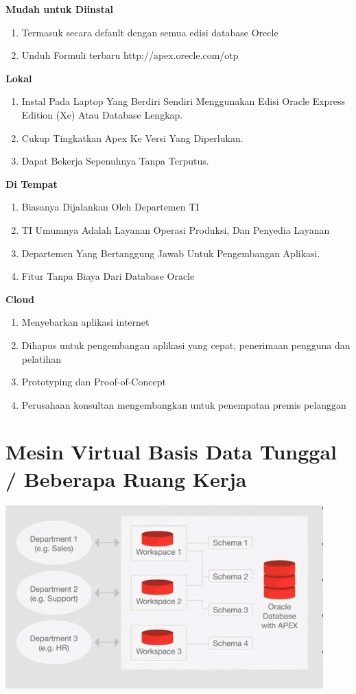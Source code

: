 \documentclass{article}
\begin{document}
\textbf{Mudah untuk Diinstal}
\begin{enumerate}
    \item Termasuk secara default dengan semua edisi database Orecle
    \item Unduh Formuli terbaru http://apex.orecle.com/otp

\end{enumerate}



\textbf{Lokal}
\begin{enumerate}
    \item Instal Pada Laptop Yang Berdiri Sendiri Menggunakan Edisi Oracle Express Edition (Xe) Atau Database Lengkap.
\item Cukup Tingkatkan Apex Ke Versi Yang Diperlukan.
\item Dapat Bekerja Sepenuhnya Tanpa Terputus.
\end{enumerate} 


\textbf{Di Tempat}
\begin{enumerate}
    \item Biasanya Dijalankan Oleh Departemen TI
\item TI Umumnya Adalah Layanan Operasi Produksi, Dan Penyedia Layanan
\item Departemen Yang Bertanggung Jawab Untuk Pengembangan Aplikasi.
\item Fitur Tanpa Biaya Dari Database Oracle
\end{enumerate}


\textbf{Cloud}
\begin{enumerate}
    \item  Menyebarkan aplikasi internet
\item Dihapus untuk pengembangan aplikasi yang cepat, penerimaan pengguna dan pelatihan\\
\item Prototyping dan Proof-of-Concept
\item Perusahaan konsultan mengembangkan untuk penempatan premis pelanggan
\end{enumerate}

\section{Mesin Virtual Basis Data Tunggal / Beberapa Ruang Kerja}

\begin{center}
    \includegraphics[width=10cm\textwidth]{gambar/3.jpg}
    
\end{center}
\end{document}
